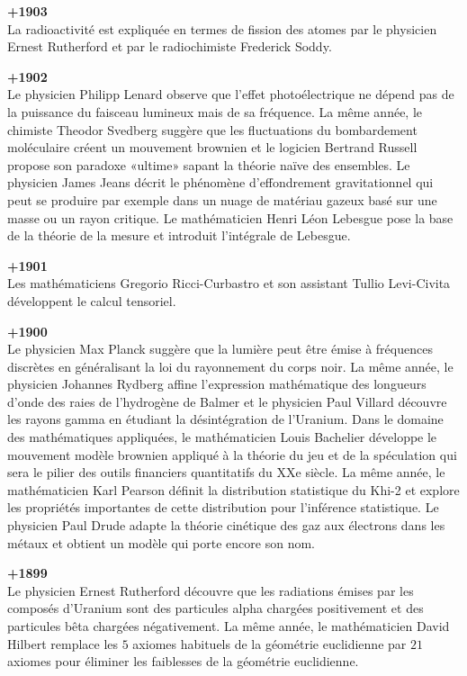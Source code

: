 \textbf{+1903}\\
La radioactivité est expliquée en termes de fission des atomes par le physicien Ernest Rutherford et par le radiochimiste Frederick Soddy.

\textbf{+1902}\\
Le physicien Philipp Lenard observe que l'effet photoélectrique ne dépend pas de la puissance du faisceau lumineux mais de sa fréquence. La même année, le chimiste Theodor Svedberg suggère que les fluctuations du bombardement moléculaire créent un mouvement brownien et le logicien Bertrand Russell propose son paradoxe «ultime» sapant la théorie naïve des ensembles. Le physicien James Jeans décrit le phénomène d'effondrement gravitationnel qui peut se produire par exemple dans un nuage de matériau gazeux basé sur une masse ou un rayon critique. Le mathématicien Henri Léon Lebesgue pose la base de la théorie de la mesure et introduit l'intégrale de Lebesgue.

\textbf{+1901}\\
Les mathématiciens Gregorio Ricci-Curbastro et son assistant Tullio Levi-Civita développent le calcul tensoriel.

\textbf{+1900}\\
Le physicien Max Planck suggère que la lumière peut être émise à fréquences discrètes en généralisant la loi du rayonnement du corps noir. La même année, le physicien Johannes Rydberg affine l'expression mathématique des longueurs d'onde des raies de l'hydrogène de Balmer et le physicien Paul Villard découvre les rayons gamma en étudiant la désintégration de l'Uranium. Dans le domaine des mathématiques appliquées, le mathématicien Louis Bachelier développe le mouvement modèle brownien appliqué à la théorie du jeu et de la spéculation qui sera le pilier des outils financiers quantitatifs du XXe siècle. La même année, le mathématicien Karl Pearson définit la distribution statistique du Khi-2 et explore les propriétés importantes de cette distribution pour l'inférence statistique. Le physicien Paul Drude adapte la théorie cinétique des gaz aux électrons dans les métaux et obtient un modèle qui porte encore son nom.

\textbf{+1899}\\
Le physicien Ernest Rutherford découvre que les radiations émises par les composés d'Uranium sont des particules alpha chargées positivement et des particules bêta chargées négativement. La même année, le mathématicien David Hilbert remplace les $5$ axiomes habituels de la géométrie euclidienne par $21$ axiomes pour éliminer les faiblesses de la géométrie euclidienne.

